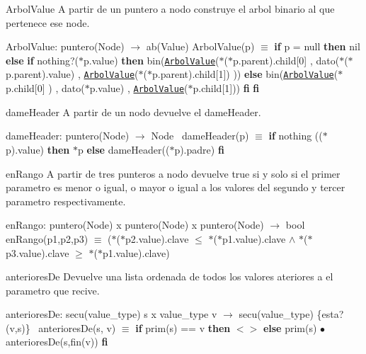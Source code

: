 \begin{DoxyParagraph}{Arbol\+Value}
A partir de un puntero a nodo construye el arbol binario al que pertenece ese node.

Arbol\+Value\+: puntero(\+Node) $\to$ ab(\+Value) Arbol\+Value(p) $\equiv$ {\bfseries if} p = null {\bfseries then} nil {\bfseries else} {\bfseries if} nothing?($\ast$p.value) {\bfseries then} bin(\href{axiomas.html#ArbolValue}{\tt Arbol\+Value}($\ast$($\ast$p.parent).child\mbox{[}0\mbox{]} , dato($\ast$($\ast$p.parent).value) , \href{axiomas.html#ArbolValue}{\tt Arbol\+Value}($\ast$($\ast$p.parent).child\mbox{[}1\mbox{]}) )) {\bfseries else} bin(\href{axiomas.html#ArbolValue}{\tt Arbol\+Value}($\ast$p.child\mbox{[}0\mbox{]} ) , dato($\ast$p.value) , \href{axiomas.html#ArbolValue}{\tt Arbol\+Value}($\ast$p.child\mbox{[}1\mbox{]})) {\bfseries fi} {\bfseries fi} 
\end{DoxyParagraph}


\begin{DoxyParagraph}{dame\+Header}
A partir de un nodo devuelve el dame\+Header.

dame\+Header\+: puntero(\+Node) $\to$ Node~\newline
 dame\+Header(p) $\equiv$ {\bfseries if} nothing (($\ast$p).value) {\bfseries then} $\ast$p {\bfseries else} dame\+Header(($\ast$p).padre) {\bfseries fi} 
\end{DoxyParagraph}


\begin{DoxyParagraph}{en\+Rango}
A partir de tres punteros a nodo devuelve true si y solo si el primer parametro es menor o igual, o mayor o igual a los valores del segundo y tercer parametro respectivamente.

en\+Rango\+: puntero(\+Node) x puntero(\+Node) x puntero(\+Node) $\to$ bool~\newline
 en\+Rango(p1,p2,p3) $\equiv$ ($\ast$($\ast$p2.value).clave $\leq$ $\ast$($\ast$p1.value).clave $\land$ $\ast$($\ast$p3.value).clave $\geq$ $\ast$($\ast$p1.value).clave) 
\end{DoxyParagraph}


\begin{DoxyParagraph}{anteriores\+De}
Devuelve una lista ordenada de todos los valores ateriores a el parametro que recive.

anteriores\+De\+: secu(value\+\_\+type) s x value\+\_\+type v $\to$ secu(value\+\_\+type) \{esta?(v,s)\}~\newline
 anteriores\+De(s, v) $\equiv$ {\bfseries if} prim(s) == v {\bfseries then} $<$$>$ {\bfseries else} prim(s) $\bullet$ anteriores\+De(s,fin(v)) {\bfseries fi} 
\end{DoxyParagraph}


